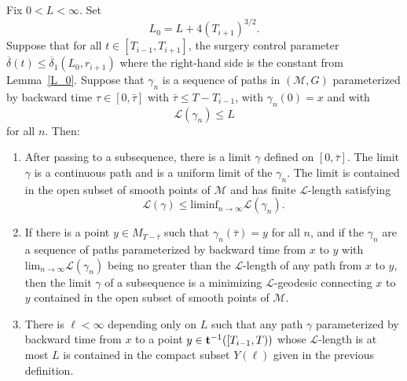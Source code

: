 \begin{proposition}
\label{prop:L-geodesics-exist-and-limit}
\label{Lgeoexist}
Fix $0<L<\infty$. Set
$$L_0=L+4(T_{i+1})^{3/2}.$$ Suppose that for all
$t\in [T_{i-1},T_{i+1}]$, the surgery control parameter
$\overline\delta(t)\le \overline\delta_1(L_0,r_{i+1})$
where the right-hand side is the constant from
Lemma~\ref{L_0}. Suppose that $\gamma_n$ is a sequence of paths in
$({\mathcal M},G)$ parameterized by backward time $\tau\in
[0,\bar\tau]$ with $\bar \tau\le T-T_{i-1}$, with $\gamma_n(0)=x$ and
with
$${\mathcal L}(\gamma_n)\le L$$
for all $n$. Then:
\begin{enumerate}
\item[(1)]
After passing to a subsequence, there is a limit $\gamma$ defined on
$[0,\bar\tau]$. The limit $\gamma$ is a continuous path and is a
uniform limit of the $\gamma_n$. The limit is contained in the open subset
of smooth points of ${\mathcal M}$ and has finite
${\mathcal L}$-length satisfying
$${\mathcal L}(\gamma)\le \mathrm{liminf}_{n\rightarrow\infty}{\mathcal L}(\gamma_n).$$
\item[(2)]
If there is a point $y\in M_{T-\bar\tau}$ such that
$\gamma_n(\bar\tau)=y$ for all $n$, and if the $\gamma_n$ are a
sequence of paths parameterized by backward time from $x$ to $y$
with $\mathrm{lim}_{n\rightarrow\infty} {\mathcal L}(\gamma_n)$ being no greater than
the ${\mathcal L}$-length of any path from $x$ to $y$, then the limit
$\gamma$ of a subsequence is a minimizing ${\mathcal L}$-geodesic
connecting $x$ to $y$ contained in the open subset of smooth points of ${\mathcal M}$.
\item[(3)] There is $\ell<\infty$ depending only on $L$ such that
any path $\gamma$ parameterized by backward time from $x$ to a
point $y\in {\bf t}^{-1}([T_{i-1},T))$ whose ${\mathcal L}$-length
is at most $L$ is contained in the compact subset $Y(\ell)$ given in
the previous definition.
\end{enumerate}
\end{proposition}


